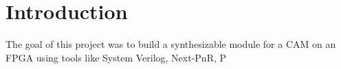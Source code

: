 \section{Introduction}
The goal of this project was to build a synthesizable module for a CAM on an FPGA using tools like System Verilog, Next-PnR, P